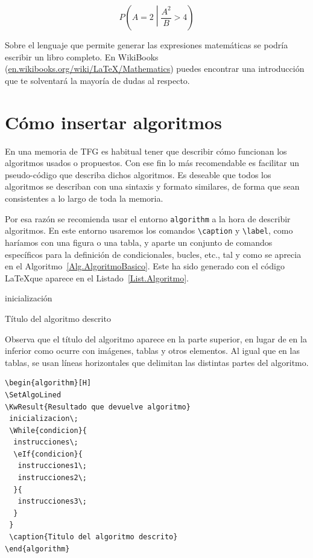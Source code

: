 \begin{equation}
    P\left(A=2\middle|\frac{A^2}{B}>4\right)
    \label{Eq.Prob1}
\end{equation}

Sobre el lenguaje que permite generar las expresiones matemáticas se podría escribir un libro completo. En WikiBooks (\url{en.wikibooks.org/wiki/LaTeX/Mathematics}) puedes encontrar una introducción que te solventará la mayoría de dudas al respecto.

\section{Cómo insertar algoritmos}

En una memoria de TFG es habitual tener que describir cómo funcionan los algoritmos usados o propuestos. Con ese fin lo más recomendable es facilitar un pseudo-código que describa dichos algoritmos. Es deseable que todos los algoritmos se describan con una sintaxis y formato similares, de forma que sean consistentes a lo largo de toda la memoria.

Por esa razón se recomienda usar el entorno \verb|algorithm| a la hora de describir algoritmos. En este entorno usaremos los comandos \verb|\caption| y \verb|\label|, como haríamos con una figura o una tabla, y aparte un conjunto de comandos específicos para la definición de condicionales, bucles, etc., tal y como se aprecia en el Algoritmo~\ref{Alg.AlgoritmoBasico}. Este ha sido generado con el código \LaTeX que aparece en el Listado~\ref{List.Algoritmo}.

\begin{algorithm}[H]
    \SetAlgoLined
    inicialización\;
    \caption{Título del algoritmo descrito}
    \label{Alg.AlgoritmoBasico}
\end{algorithm}

Observa que el título del algoritmo aparece en la parte superior, en lugar de en la inferior como ocurre con imágenes, tablas y otros elementos. Al igual que en las tablas, se usan líneas horizontales que delimitan las distintas partes del algoritmo.

\begin{lstlisting}[language={[LaTeX]TeX},caption={Descripción de un algoritmo},label=List.Algoritmo]
\begin{algorithm}[H]
\SetAlgoLined
\KwResult{Resultado que devuelve algoritmo}
 inicializacion\;
 \While{condicion}{
  instrucciones\;
  \eIf{condicion}{
   instrucciones1\;
   instrucciones2\;
  }{
   instrucciones3\;
  }
 }
 \caption{Titulo del algoritmo descrito}
\end{algorithm}
\end{lstlisting}

